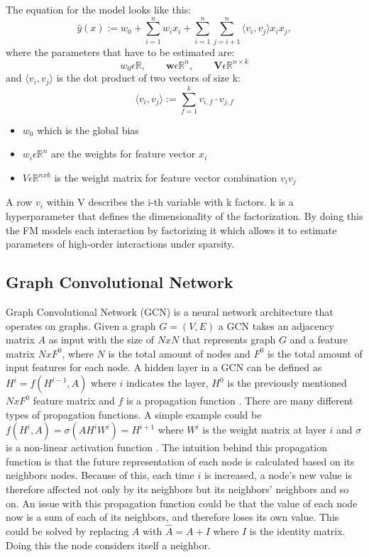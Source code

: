 The equation for the model looks like this:
\[ \hat{y}(x) := w_0 + \sum_{i=1}^{n} w_ix_i + \sum_{i=1}^{n}\sum_{j=i+1}^{n} \big \langle v_i,v_j \big \rangle x_ix_j, \]
where the parameters that have to be estimated are:
\[ w_0 \epsilon \mathbb{R}, \qquad \mathbf{w} \epsilon \mathbb{R}^n, \qquad  \mathbf{V}\epsilon \mathbb{R}^{n \times k} \]
and $\big \langle v_i,v_j \big \rangle$ is the dot product of two vectors of size k:
\[ \big \langle v_i,v_j \big \rangle := \sum_{f=1}^{k} v_{i,f} \cdot v_{j,f}\]

\begin{itemize}
    \item $w_0$ which is the global bias
    \item $w_i \epsilon \mathbb{R}^n$ are the weights for feature vector $x_i$
    \item $V \epsilon \mathbb{R}^{nxk}$ is the weight matrix for feature vector combination $v_iv_j$
\end{itemize}
A row $v_i$ within V describes the i-th variable with k factors.
k is a hyperparameter that defines the dimensionality of the factorization.
By doing this the FM models each interaction by factorizing it which allows it to estimate parameters of high-order interactions under sparsity.



\subsection{Graph Convolutional Network}
Graph Convolutional Network (GCN) is a neural network architecture that operates on graphs.
Given a graph $G = (V,E)$ a GCN takes an adjacency matrix $A$ as input with the size of $N x N$ that represents graph $G$ and a feature matrix $N x F^0$, where $N$ is the total amount of nodes and $F^0$ is the total amount of input features for each node.
A hidden layer in a GCN can be defined as $H^i = f(H^{i-1}, A)$ where $i$ indicates the layer, $H^0$ is the previously mentioned $N x F^0$ feature matrix and $f$ is a propagation function \cite{Deep-Learning-on-Graphs-with-GCN}.
There are many different types of propagation functions.
A simple example could be $f(H^i, A) = \sigma(AH^iW^i) = H^{i+1}$ where $W^i$ is the weight matrix at layer $i$ and $\sigma$ is a non-linear activation function \cite{Deep-Learning-on-Graphs-with-GCN}.
The intuition behind this propagation function is that the future representation of each node is calculated based on its neighbors nodes.
Because of this, each time $i$ is increased, a node's new value is therefore affected not only by its neighbors but its neighbors' neighbors and so on.
An issue with this propagation function could be that the value of each node now is a sum of each of its neighbors, and therefore loses its own value.
This could be solved by replacing $A$ with $\hat{A} = A + I$ where $I$ is the identity matrix.
Doing this the node considers itself a neighbor.
